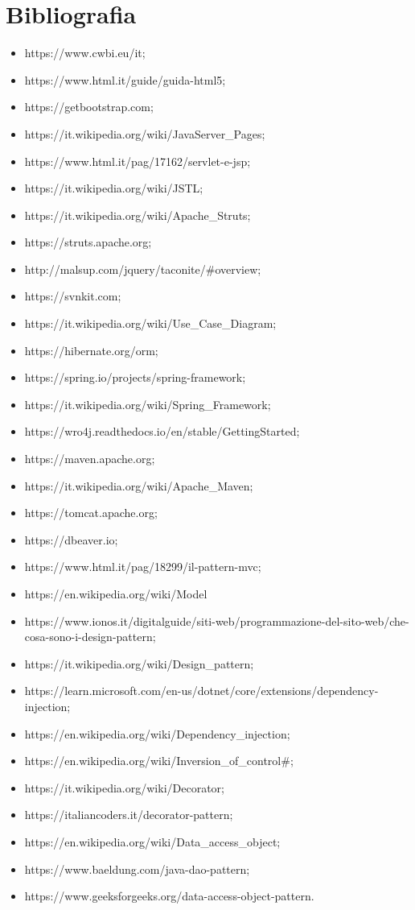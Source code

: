 \cleardoublepage
\chapter{Bibliografia}
\noindent
\begin{itemize}
\item https://www.cwbi.eu/it;
\item https://www.html.it/guide/guida-html5;
\item https://getbootstrap.com;
\item https://it.wikipedia.org/wiki/JavaServer\_Pages;
\item https://www.html.it/pag/17162/servlet-e-jsp;
\item https://it.wikipedia.org/wiki/JSTL;
\item https://it.wikipedia.org/wiki/Apache\_Struts;
\item https://struts.apache.org;
\item http://malsup.com/jquery/taconite/#overview;
\item https://svnkit.com;
\item https://it.wikipedia.org/wiki/Use\_Case\_Diagram;
\item https://hibernate.org/orm;
\item https://spring.io/projects/spring-framework;
\item https://it.wikipedia.org/wiki/Spring\_Framework;
\item https://wro4j.readthedocs.io/en/stable/GettingStarted;
\item https://maven.apache.org;
\item https://it.wikipedia.org/wiki/Apache\_Maven;
\item https://tomcat.apache.org;
\item https://dbeaver.io;
\item https://www.html.it/pag/18299/il-pattern-mvc;
\item https://en.wikipedia.org/wiki/Model%
\item https://www.ionos.it/digitalguide/siti-web/programmazione-del-sito-web/che-cosa-sono-i-design-pattern;
\item https://it.wikipedia.org/wiki/Design\_pattern;
\item https://learn.microsoft.com/en-us/dotnet/core/extensions/dependency-injection;
\item https://en.wikipedia.org/wiki/Dependency\_injection;
\item https://en.wikipedia.org/wiki/Inversion\_of\_control#;
\item https://it.wikipedia.org/wiki/Decorator;
\item https://italiancoders.it/decorator-pattern;
\item https://en.wikipedia.org/wiki/Data\_access\_object;
\item https://www.baeldung.com/java-dao-pattern;
\item https://www.geeksforgeeks.org/data-access-object-pattern.
\end{itemize}
\nocite{*}

\printbibliography[heading=subbibliography,title={Riferimenti bibliografici},type=book]

\printbibliography[heading=subbibliography,title={Siti web consultati},type=online]
